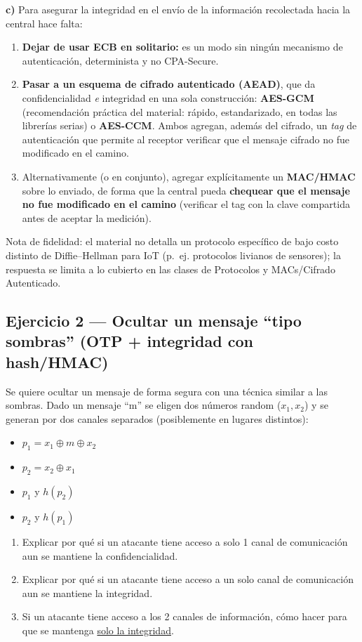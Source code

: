 \textbf{c)} Para asegurar la integridad en el envío de la información recolectada hacia la
central hace falta:
\begin{enumerate}
  \item \textbf{Dejar de usar ECB en solitario:} es un modo sin ningún mecanismo de
  autenticación, determinista y no CPA-Secure.
  \item \textbf{Pasar a un esquema de cifrado autenticado (AEAD)}, que da confidencialidad
  \emph{e} integridad en una sola construcción: \textbf{AES-GCM} (recomendación práctica del
  material: rápido, estandarizado, en todas las librerías serias) o \textbf{AES-CCM}. Ambos
  agregan, además del cifrado, un \emph{tag} de autenticación que permite al receptor
  verificar que el mensaje cifrado no fue modificado en el camino.
  \item Alternativamente (o en conjunto), agregar explícitamente un \textbf{MAC/HMAC} sobre lo
  enviado, de forma que la central pueda \textbf{chequear que el mensaje no fue modificado en
  el camino} (verificar el tag con la clave compartida antes de aceptar la medición).
\end{enumerate}
Nota de fidelidad: el material no detalla un protocolo específico de bajo costo distinto de
Diffie--Hellman para IoT (p.\ ej. protocolos livianos de sensores); la respuesta se limita a
lo cubierto en las clases de Protocolos y MACs/Cifrado Autenticado.

\subsection{Ejercicio 2 --- Ocultar un mensaje ``tipo sombras'' (OTP + integridad con hash/HMAC)}

\begin{consigna}
Se quiere ocultar un mensaje de forma segura con una técnica similar a las sombras. Dado un
mensaje ``m'' se eligen dos números random ($x_1,x_2$) y se generan por dos canales separados
(posiblemente en lugares distintos):
\begin{itemize}
  \item $p_1 = x_1 \oplus m \oplus x_2$
  \item $p_2 = x_2 \oplus x_1$
  \item $p_1$ y $h(p_2)$
  \item $p_2$ y $h(p_1)$
\end{itemize}
\begin{enumerate}
  \item[a)] Explicar por qué si un atacante tiene acceso a solo 1 canal de comunicación aun se
  mantiene la confidencialidad.
  \item[b)] Explicar por qué si un atacante tiene acceso a un solo canal de comunicación aun se
  mantiene la integridad.
  \item[c)] Si un atacante tiene acceso a los 2 canales de información, cómo hacer para que se
  mantenga \underline{solo la integridad}.
\end{enumerate}
\end{consigna}

